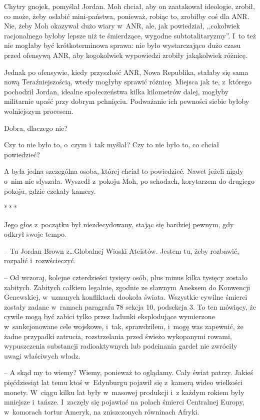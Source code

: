 \documentclass[oneside,polish,11pt,sfheadings]{mwbk}
\newcommand{\threeast}{\bigskip\par\centerline{*\,*\,*}\medskip\par}%
\begin{document}
Chytry gnojek, pomyślał Jordan. Moh chciał, aby on zaatakował ideologie,
zrobił, co może, żeby osłabić mini-państwa, ponieważ, robiąc to,
zrobiłby coś dla ANR. Nie, żeby Moh okazywał dużo wiary w~ANR, ale, jak
powiedział, ,,cokolwiek racjonalnego byłoby lepsze niż te śmierdzące,
wygodne subtotalitaryzmy''. I~to też nie mogłaby być krótkoterminowa
sprawa: nie było wystarczająco dużo czasu przed ofensywą ANR, aby
kogokolwiek wypowiedzi zrobiły jakąkolwiek różnicę.

Jednak po ofensywie, kiedy przyszłość ANR, Nowa Republika, stałaby się
sama nową Teraźniejszością, wtedy mogłyby sprawić różnicę. Miejsca jak
te, z~którego pochodził Jordan, idealne społeczeństwa kilka kilometrów
dalej, mogłyby militarnie upaść przy dobrym pchnięciu. Podważanie ich
pewności siebie byłoby wolniejszym procesem.

Dobra, dlaczego nie?

Czy to nie było to, o~czym i~tak myślał? Czy to nie było to, co chciał
powiedzieć?

A była jedna szczególna osoba, której chciał to powiedzieć. Nawet jeżeli
nigdy o~nim nie słyszała. Wyszedł z~pokoju Moh, po schodach, korytarzem
do drugiego pokoju, gdzie czekały kamery.
  \threeast 

Jego głos z~początku był niezdecydowany, stając się bardziej pewnym, gdy
odkrył swoje tempo.

-- Tu Jordan Brown z\ldots Globalnej Wioski Ateistów. Jestem tu, żeby
rozbawić, rozpalić i~rozwścieczyć.

-- Od wczoraj, kolejne czterdzieści tysięcy osób, plus minus kilka
tysięcy zostało zabitych. Zabitych całkiem legalnie, zgodnie ze sławnym
Aneksem do Konwencji Genewskiej, w~uznanych konfliktach dookoła świata.
Wszystkie cywilne śmierci zostały zadane w~ramach paragrafu 78 sekcja
10, podsekcja 3. To ten mówiący, że cywile mogą być zabici tylko przez
ładunki eksplodujące wymierzone w~sankcjonowane cele wojskowe, i~tak,
sprawdziłem, i~mogę was zapewnić, że żadne przypadki zatrucia,
rozstrzelania przed świeżo wykopanymi rowami, wypuszczenia substancji
radioaktywnych lub podcinania gardeł nie zwróciły uwagi właściwych
władz.

-- A skąd my to wiemy? Wiemy, ponieważ to oglądamy. Cały świat patrzy.
Jakieś pięćdziesiąt lat temu ktoś w~Edynburgu pojawił się z~kamerą wideo
wielkości monety. W~ciągu kilku lat były w~masowej produkcji i~z każdym
rokiem były mniejsze i~tańsze. I~zaczęły się pojawiać na polach śmierci
Centralnej Europy, w~komorach tortur Ameryk, na zniszczonych równinach
Afryki.
\end{document}

